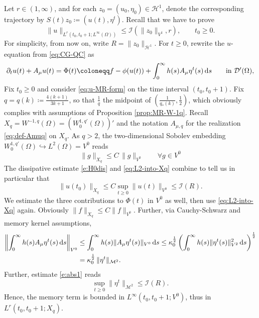 \documentclass[12pt,leqno]{amsart}
\def\d{{\rm d}}
\def\pt {{\partial_t}}
\theoremstyle{definition}
\numberwithin{equation}{section}
\numberwithin{figure}{section}
\begin{document}
 Let
$r\in (1,\infty)$, and  for each $z_0=(u_0,\eta_0)\in {\mathcal H^1}$, denote  the corresponding
trajectory by $S(t)z_0\coloneqq (u(t),\eta^t)$. Recall that we have to prove
\begin{equation}\label{eq:MR-Linfty-on-B1}
\|u\|_{L^r(t_0,t_0+1;L^\infty(\Omega))}\le \mathcal I(\|z_0\|_{{V^1}},r), \qquad t_0\ge 0.
\end{equation}
For simplicity, from now on, write $R=\|z_0\|_{\mathcal H^1}$.
For $t\ge0$, rewrite the $u$-equation from \eqref{eq:CG-QC} as
\begin{equation}\label{eq:u-MR-form}
\pt u(t)+A_\mu u(t)=\Phi(t) \coloneqq f-\phi(u(t))+\int_0^\infty h(s)A_\mu\eta^t(s)\,\d s \qquad \text{in }\mathcal D'(\Omega),
\end{equation}
Fix $t_0\ge0$ and consider \eqref{eq:u-MR-form} on the time interval $(t_0,t_0+1)$. Fix $q=q(k)\coloneqq \frac{4(k+1)}{3k+1} $, so that $\frac1q$ the midpoint of $(\frac{1}{q_*(k)}, \frac{1}{2})$, which obviously complies with assumptions of Proposition \ref{prop:MR-W-1q}. Recall $X_q=W^{-1,q}(\Omega)=(W_0^{1,q'}(\Omega))'$ and the notation  $A_{\mu,q}$ for the
realization \eqref{eq:def-Amuq} on $X_q$.
As $q>2$,  the two-dimensional Sobolev embedding
$W_0^{1,q'}(\Omega)\hookrightarrow L^2(\Omega)=V^0$ reads 
\begin{equation}\label{eq:L2-into-Xq}
\|g\|_{X_q}\le C\,\|g\|_{V^0}\qquad \forall g\in V^0
\end{equation}
The dissipative estimate  \eqref{e:H0dis} and  \eqref{eq:L2-into-Xq} combine to tell us in particular that
\begin{equation}\label{eq:uL2-unif} \|u(t_0)\|_{X_q} \leq C
\sup_{t\ge0}\|u(t)\|_{V^0}\le \mathcal I(R).
\end{equation}
We estimate the three contributions to $\Phi(t)$ in $V^0$ as well, then use \eqref{eq:L2-into-Xq} again.
Obviously  $\|f\|_{X_q}\le C\|f\|_{V^0}$.
Further, via  Cauchy-Schwarz and memory kernel assumptions,
\[ 
\begin{split}
\left\|\int_0^\infty h(s) A_\mu\eta^t(s)\,\d s\right\|_{V^0}
&\le \int_0^\infty h(s)\|A_\mu\eta^t(s)\|_{V^0}\,\d s
\le \kappa_0^{{\frac12}}\left(\int_0^\infty h(s)\|\eta^t(s)\|_{{V^2}}^2\,\d s\right)^{\frac12} \\ &
= \kappa_0^{\frac12}\,\|\eta^t\|_{\mathcal M^2}.
\end{split}
\]
Further, estimate \eqref{e:abs1}  reads
\[\sup_{t\ge0}\|\eta^t\|_{\mathcal M^2}\le \mathcal I(R).\] Hence, the memory term is bounded in
$L^\infty(t_0,t_0+1;V^0)$, thus in $L^r(t_0,t_0+1;X_q)$.
\end{document}
